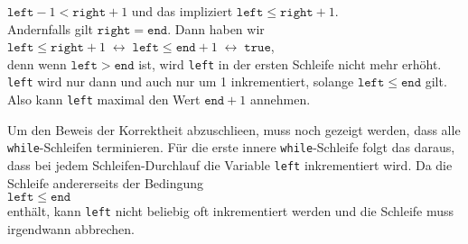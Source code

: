 \begin{enumerate}
      \hspace*{1.3cm} $\mathtt{left} - 1 < \mathtt{right} + 1$ \quad und das impliziert \quad $\mathtt{left} \leq \mathtt{right} + 1$. 
      \\[0.1cm]
      Andernfalls gilt $\texttt{right}=\mathtt{end}$.  Dann haben wir 
      \\[0.1cm]
      \hspace*{1.3cm}
      $\mathtt{left} \leq \mathtt{right} + 1 \;\leftrightarrow\;
       \mathtt{left} \leq \mathtt{end} + 1 \;\leftrightarrow\; \mathtt{true}$,
      \\[0.1cm]
      denn wenn $\texttt{left} > \mathtt{end}$ ist, wird \texttt{left} in der ersten
      Schleife nicht mehr erh\"oht.  \texttt{left} wird nur dann und auch nur um 1
      inkrementiert, solange $\texttt{left} \leq \mathtt{end}$ gilt.
      Also kann \texttt{left} maximal den Wert $\texttt{end} + 1$ annehmen.
\end{enumerate}
Um den Beweis der Korrektheit abzuschlie\3en, muss noch gezeigt werden, dass 
alle \texttt{while}-Schleifen terminieren.  F\"ur die erste innere
\texttt{while}-Schleife folgt das daraus, dass bei jedem Schleifen-Durchlauf die Variable
\texttt{left} inkrementiert wird.  Da die Schleife andererseits der Bedingung \\[0.1cm]
\hspace*{1.3cm} $\texttt{left} \leq \mathtt{end}$ \\[0.1cm]
enth\"alt, kann \texttt{left} nicht beliebig oft inkrementiert werden und die Schleife muss
irgendwann abbrechen. 

